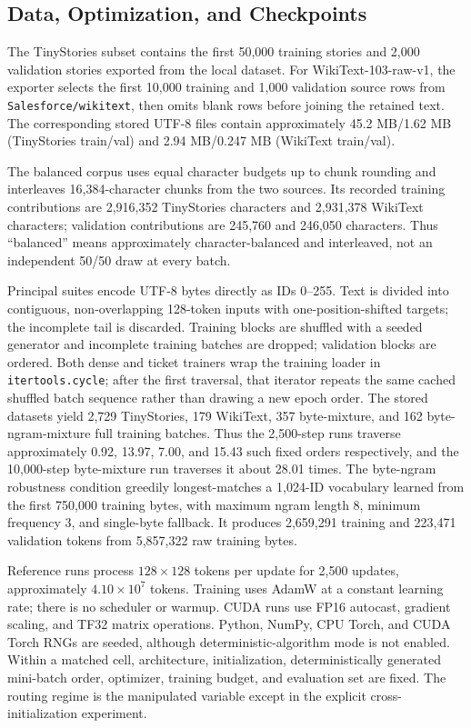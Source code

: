 \documentclass{article}
\begin{document}
\subsection{Data, Optimization, and Checkpoints}

The TinyStories subset contains the first 50,000 training stories and 2,000
validation stories exported from the local dataset. For WikiText-103-raw-v1,
the exporter selects the first 10,000 training and 1,000 validation source rows
from \texttt{Salesforce/wikitext}, then omits blank rows before joining the
retained text. The corresponding
stored UTF-8 files contain approximately 45.2 MB/1.62 MB (TinyStories train/val)
and 2.94 MB/0.247 MB (WikiText train/val).

The balanced corpus uses equal character budgets up to chunk rounding and
interleaves 16,384-character chunks from the two sources. Its recorded training
contributions are 2,916,352 TinyStories characters and 2,931,378 WikiText
characters; validation contributions are 245,760 and 246,050 characters. Thus
``balanced'' means approximately character-balanced and interleaved, not an
independent 50/50 draw at every batch.

Principal suites encode UTF-8 bytes directly as IDs 0--255. Text is divided
into contiguous, non-overlapping 128-token inputs with one-position-shifted
targets; the incomplete tail is discarded. Training blocks are shuffled with a
seeded generator and incomplete training batches are dropped; validation blocks
are ordered. Both dense and ticket trainers wrap the training loader in
\texttt{itertools.cycle}; after the first traversal, that iterator repeats the
same cached shuffled batch sequence rather than drawing a new epoch order. The
stored datasets yield 2,729 TinyStories, 179 WikiText, 357 byte-mixture, and 162
byte-ngram-mixture full training batches. Thus the 2,500-step runs traverse
approximately 0.92, 13.97, 7.00, and 15.43 such fixed orders respectively, and
the 10,000-step byte-mixture run traverses it about 28.01 times. The byte-ngram
robustness condition greedily longest-matches a
1,024-ID vocabulary learned from the first 750,000 training bytes, with maximum
ngram length 8, minimum frequency 3, and single-byte fallback. It produces
2,659,291 training and 223,471 validation tokens from 5,857,322 raw training
bytes.

Reference runs process $128\times128$ tokens per update for 2,500 updates,
approximately $4.10\times10^7$ tokens. Training uses AdamW at a constant
learning rate; there is no scheduler or warmup. CUDA runs use FP16 autocast,
gradient scaling, and TF32 matrix operations. Python, NumPy, CPU Torch, and CUDA
Torch RNGs are seeded, although deterministic-algorithm mode is not enabled.
Within a matched cell, architecture, initialization, deterministically generated
mini-batch order, optimizer, training budget, and evaluation set are fixed. The
routing regime is the manipulated variable except in the explicit
cross-initialization experiment.
\end{document}
